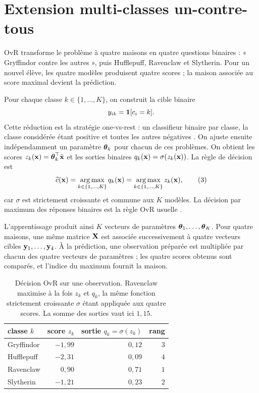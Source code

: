 \chapter{Extension multi-classes un-contre-tous}
\label{ch:ovr}

\begin{lecture}
OvR transforme le problème à quatre maisons en quatre questions binaires :
« Gryffindor contre les autres », puis Hufflepuff, Ravenclaw et Slytherin. Pour
un nouvel élève, les quatre modèles produisent quatre scores ; la maison associée
au score maximal devient la prédiction.
\end{lecture}

Pour chaque classe $k\in\{1,\ldots,K\}$, on construit la cible binaire
\[
  y_{ik}=\mathbf{1}[c_i=k].
\]
Cette réduction est la stratégie one-vs-rest : un classifieur binaire par classe,
la classe considérée étant positive et toutes les autres négatives
\cite[sec.~4.1]{rifkin2004}. On ajuste ensuite indépendamment un paramètre
$\boldsymbol{\theta}_k$ pour chacun de ces problèmes. On obtient les scores
$z_k(\mathbf{x})=\boldsymbol{\theta}_k^\top\tilde{\mathbf{x}}$ et les sorties binaires
$q_k(\mathbf{x})=\sigma(z_k(\mathbf{x}))$. La règle de décision est
\[
  \widehat c(\mathbf{x})=\operatorname*{arg\,max}_{k\in\{1,\ldots,K\}}q_k(\mathbf{x})
  =\operatorname*{arg\,max}_{k\in\{1,\ldots,K\}}z_k(\mathbf{x}),
  \tag{3}\label{eq:ovr-decision}
\]
car $\sigma$ est strictement croissante et commune aux $K$ modèles.
La décision par maximum des réponses binaires est la règle OvR usuelle
\cite{rifkin2004}.

L'apprentissage produit ainsi $K$ vecteurs de paramètres
$\boldsymbol{\theta}_1,\ldots,\boldsymbol{\theta}_K$. Pour quatre maisons, une même matrice $\mathbf{X}$ est associée
successivement à quatre vecteurs cibles $\mathbf{y}_1,\ldots,\mathbf{y}_4$. À la prédiction, une
observation préparée est multipliée par chacun des quatre vecteurs de paramètres ;
les quatre scores obtenus sont comparés, et l'indice du maximum fournit la maison.

\begin{table}[htbp]
\centering
\begin{tabular}{lrrr}
\toprule
classe $k$ & score $z_k$ & sortie $q_k=\sigma(z_k)$ & rang \\
\midrule
Gryffindor & $-1{,}99$ & $0{,}12$ & $3$ \\
Hufflepuff & $-2{,}31$ & $0{,}09$ & $4$ \\
Ravenclaw  & $ 0{,}90$ & $0{,}71$ & $1$ \\
Slytherin  & $-1{,}21$ & $0{,}23$ & $2$ \\
\bottomrule
\end{tabular}
\caption{Décision OvR sur une observation. Ravenclaw maximise à la fois $z_k$ et
$q_k$, la même fonction strictement croissante $\sigma$ étant appliquée aux
quatre scores. La somme des sorties vaut ici $1{,}15$.}
\label{tab:ovr-example}
\end{table}

